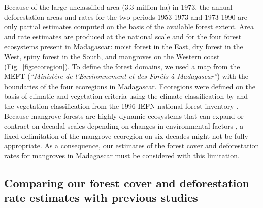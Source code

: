 \documentclass[a4paper, 12pt, leqno]{article}\usepackage[]{graphicx}\usepackage[]{color}
\begin{document}
Because of the large unclassified area (3.3 million ha) in 1973, the
annual deforestation areas and rates for the two periods 1953-1973 and
1973-1990 are only partial estimates computed on the basis of the
available forest extent. Area and rate estimates are produced at the
national scale and for the four forest ecosystems present in
Madagascar: moist forest in the East, dry forest in the West, spiny
forest in the South, and mangroves on the Western coast
(Fig.~\ref{fig:ecoregion}). To define the forest domains, we used a
map from the MEFT (\emph{``Ministère de l'Environnement et des Forêts
  à Madagascar''}) with the boundaries of the four ecoregions in
Madagascar. Ecoregions were defined on the basis of climatic and
vegetation criteria using the climate classification by
\citet{Cornet1974} and the vegetation classification from the 1996
IEFN national forest inventory \citep{IEFN1996}. Because mangrove
forests are highly dynamic ecosystems that can expand or contract on
decadal scales depending on changes in environmental factors
\citep{Armitage2015}, a fixed delimitation of the mangrove ecoregion
on six decades might not be fully appropriate. As a consequence, our
estimates of the forest cover and deforestation rates for mangroves in
Madagascar must be considered with this limitation.

\subsection{Comparing our forest cover and deforestation rate
estimates with previous studies}
\end{document}
